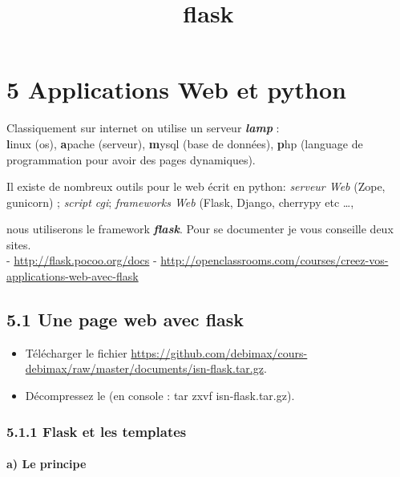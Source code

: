 \documentclass{article}
\title{flask}
\begin{document}
    
    
    \maketitle
    
    

    

    \section{5 Applications Web et python}


    Classiquement sur internet on utilise un serveur \textbf{\emph{lamp}}
:\\\textbf{l}inux (os), \textbf{a}pache (serveur), \textbf{m}ysql (base
de données), \textbf{p}hp (language de programmation pour avoir des
pages dynamiques).

Il existe de nombreux outils pour le web écrit en python: \emph{serveur
Web} (Zope, gunicorn) ; \emph{script cgi}; \emph{frameworks Web} (Flask,
Django, cherrypy etc \ldots{},

nous utiliserons le framework \textbf{\emph{flask}}. Pour se documenter
je vous conseille deux sites.\\- \url{http://flask.pocoo.org/docs} -
\url{http://openclassrooms.com/courses/creez-vos-applications-web-avec-flask}

\subsection{5.1 Une page web avec flask}\label{une-page-web-avec-flask}

\begin{itemize}
\itemsep1pt\parskip0pt
\item
  Télécharger le fichier
  \url{https://github.com/debimax/cours-debimax/raw/master/documents/isn-flask.tar.gz}.
\item
  Décompressez le (en console : tar zxvf isn-flask.tar.gz).
\end{itemize}

\subsubsection{5.1.1 Flask et les
templates}\label{flask-et-les-templates}

\paragraph{a) Le principe}\label{a-le-principe}
\end{document}
